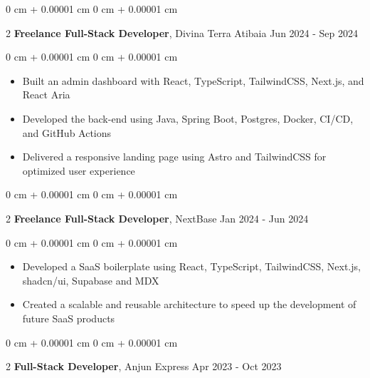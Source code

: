 \documentclass[10pt, letterpaper]{article}
\newenvironment{highlights}{ \begin{itemize}[ topsep=0.10 cm, parsep=0.10 cm, partopsep=0pt,
itemsep=0pt, leftmargin=0 cm + 10pt ] }{ \end{itemize} } %
\newenvironment{onecolentry}{ \begin{adjustwidth}{ 0 cm + 0.00001 cm }{ 0 cm + 0.00001 cm }
}{ \end{adjustwidth} } %
\newenvironment{twocolentry}[2][]{ \onecolentry \def\secondColumn{#2} \setcolumnwidth{\fill, 4.5 cm}
\begin{paracol}{2} }{ \switchcolumn \raggedleft \secondColumn \end{paracol}
\endonecolentry } %
\begin{document}
	\begin{twocolentry}
		{ Jun 2024 - Sep 2024 } \textbf{Freelance Full-Stack Developer}, Divina Terra Atibaia
	\end{twocolentry}

	\vspace{0.10 cm}
	\begin{onecolentry}
		\begin{highlights}
			\item Built an admin dashboard with React, TypeScript, TailwindCSS, Next.js,
			and React Aria
			\item Developed the back-end using Java, Spring Boot, Postgres,
			Docker, CI/CD, and GitHub Actions
			\item Delivered a responsive landing
			page using Astro and TailwindCSS for optimized user experience
		\end{highlights}
	\end{onecolentry}

	\vspace{0.2 cm}

	\begin{twocolentry}
		{ Jan 2024 - Jun 2024 } \textbf{Freelance Full-Stack Developer}, NextBase
	\end{twocolentry}

	\vspace{0.10 cm}
	\begin{onecolentry}
		\begin{highlights}
			\item Developed a SaaS boilerplate using React, TypeScript, TailwindCSS,
			Next.js, shadcn/ui, Supabase and MDX
			\item Created a scalable and reusable
			architecture to speed up the development of future SaaS products
		\end{highlights}
	\end{onecolentry}

	\vspace{0.2 cm}

	\begin{twocolentry}
		{ Apr 2023 - Oct 2023 } \textbf{Full-Stack Developer}, Anjun Express
	\end{twocolentry}
\end{document}
